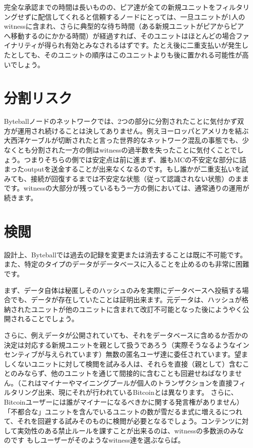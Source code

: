 \documentclass[a4paper, dvipdfmx]{jsarticle}
\begin{document}
完全な承認までの時間は長いものの、ピア達が全ての新規ユニットをフィルタリングせずに配信してくれると信頼するノードにとっては、一旦ユニットが1人のwitnessに含まれ、さらに典型的な待ち時間（ある新規ユニットがピアからピアへ移動するのにかかる時間）が経過すれば、そのユニットはほとんどの場合ファイナリティが得られ有効とみなされるはずです。たとえ後に二重支払いが発生したとしても、そのユニットの順序はこのユニットよりも後に置かれる可能性が高いでしょう。

\section{分割リスク}
Byteballノードのネットワークでは、2つの部分に分割されたことに気付かず双方が運用され続けることは決してありません。例えヨーロッパとアメリカを結ぶ大西洋ケーブルが切断されたと言った世界的なネットワーク混乱の事態でも、少なくとも分割された一方の側はwitnessの過半数を失ったことに気付くことでしょう。つまりそちらの側では安定点は前に進まず、誰もMCの不安定な部分に詰まったoutputを送金することが出来なくなるのです。もし誰かが二重支払いを試みても、接続が回復するまでは不安定な状態（従って認識されない状態）のままです。witnessの大部分が残っているもう一方の側においては、通常通りの運用が続きます。

\section{検閲}
設計上、Byteballでは過去の記録を変更または消去することは既に不可能です。また、特定のタイプのデータがデータベースに入ることを止めるのも非常に困難です。

まず、データ自体は秘匿しそのハッシュのみを実際にデータベースへ投稿する場合でも、データが存在していたことは証明出来ます。元データは、ハッシュが格納されたユニットが他のユニットに含まれて改訂不可能となった後にようやく公開されることでしょう。

さらに、例えデータが公開されていても、それをデータベースに含めるか否かの決定は対応する新規ユニットを親として扱うであろう（実際そうなるようなインセンティブが与えられています）無数の匿名ユーザ達に委任されています。望ましくないユニットに対して検閲を試みる人は、それらを直接（親として）含むことのみならず、他のユニットを通じて間接的に含むことも回避せねばなりません。（これはマイナーやマイニングプールが個人のトランザクションを直接フィルタリング出来、現にそれが行われているBitcoinとは異なります。 さらに、Bitcoinユーザーには誰がマイナーになるべきかに関する発言権がありません） 「不都合な」ユニットを含んでいるユニットの数が雪だるま式に増えるにつれて、それを回避する試みそのものに検閲が必要となるでしょう。コンテンツに対して実効性のある禁止ルールを課すことが出来るのは、witnessの多数派のみなのです  もしユーザーがそのようなwitness達を選ぶならば。
\end{document}
